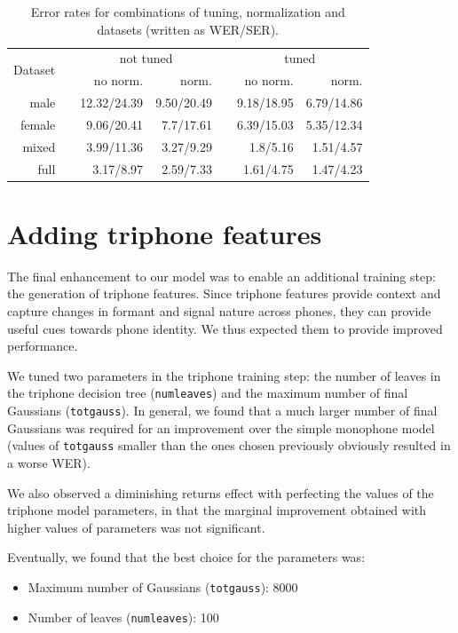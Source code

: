 \documentclass[twocolumn, 11pt]{article}
\begin{document}
\begin{table}\centering
  \begin{tabular}{@{}rcrrcrr@{}}\toprule%
    \multirow{2}{*}{Dataset} & \phantom{a} & \multicolumn{2}{c}{not tuned}
    & \phantom{a} & \multicolumn{2}{c}{tuned}\\
    \cmidrule{3-4} \cmidrule{6-7}
    && no norm. & norm. && no norm. & norm.\\ \midrule%
    male && 12.32/24.39 & 9.50/20.49 && 9.18/18.95 & 6.79/14.86\\
    female && 9.06/20.41 & 7.7/17.61 && 6.39/15.03 & 5.35/12.34\\
    mixed && 3.99/11.36 & 3.27/9.29 && 1.8/5.16 & 1.51/4.57\\
    full && 3.17/8.97 & 2.59/7.33 && 1.61/4.75 & 1.47/4.23\\
  \end{tabular}
  \caption{Error rates for combinations of tuning, normalization and
  datasets (written as WER/SER).}\label{tab:wer-comb}
\end{table}

\section{Adding triphone features}

The final enhancement to our model was to enable an additional training step:
the generation of triphone features. Since triphone features provide context and
capture changes in formant and signal nature across phones, they can provide
useful cues towards phone identity. We thus expected them to provide improved
performance.

We tuned two parameters in the triphone training step: the number of leaves in
the triphone decision tree (\texttt{numleaves}) and the maximum number of final
Gaussians (\texttt{totgauss}). In general, we found that a much larger number of
final Gaussians was required for an improvement over the simple monophone model
(values of \texttt{totgauss} smaller than the ones chosen previously obviously
resulted in a worse WER).

We also observed a diminishing returns effect with perfecting the values of the
triphone model parameters, in that the marginal improvement obtained with higher
values of parameters was not significant.

Eventually, we found that the best choice for the parameters was:
\begin{itemize}
  \item Maximum number of Gaussians (\texttt{totgauss}): 8000
  \item Number of leaves (\texttt{numleaves}): 100
\end{itemize}
\end{document}
